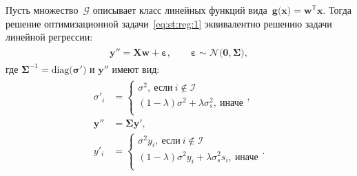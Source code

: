 \documentclass[12pt]{a&t}
\begin{document}
\begin{theorem}
\label{theorem:st:reg}
Пусть множество~$\mathcal{G}$ описывает класс линейных функций вида~$\mathbf{g}\bigr(\mathbf{x}\bigr) = \mathbf{w}^{\mathsf{T}}\mathbf{x}.$ Тогда решение оптимизационной задачи~\eqref{eq:st:reg:1} эквивалентно решению задачи линейной регрессии:
\begin{gather}
\label{eq:st:reg:th:st:1}
\begin{aligned}
\mathbf{y''} = \mathbf{X}\mathbf{w} + \bm{\varepsilon},\qquad \bm{\varepsilon} \sim \mathcal{N}\bigr(\mathbf{0}, \bm{\Sigma}\bigr),
\end{aligned}
\end{gather}
где $\bm{\Sigma}^{-1}=\text{diag}\bigr(\bm{\sigma'}\bigr)$ и $\mathbf{y''}$ имеют вид:
\begin{gather}
\label{eq:st:reg:th:st:2}
\begin{aligned}
\sigma'_{i} &= \begin{cases}
\sigma^2,~\text{если}~i \not \in \mathcal{I}\\
\left(1-\lambda\right)\sigma^2+\lambda\sigma_s^2,~\text{иначе}\\
\end{cases}, \\
\mathbf{y''} &= \bm{\Sigma}\mathbf{y'},\\
y'_i &= \begin{cases}
\sigma^2y_i,~\text{если}~i \not \in \mathcal{I}\\
\left(1-\lambda\right)\sigma^2y_i+\lambda\sigma_s^2s_i,~\text{иначе}\\
\end{cases}.
\end{aligned}
\end{gather}
\end{theorem}
\end{document}
